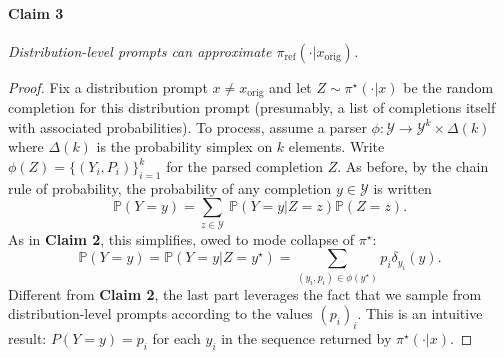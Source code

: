 \paragraph{Claim 3} \textit{Distribution-level prompts can approximate $\pi_\text{ref}(\cdot | x_\text{orig})$.}
\begin{proof}
Fix a distribution prompt $x \neq x_\text{orig}$ and let $Z \sim \pi^\star(\cdot | x)$ be the random completion for this distribution prompt (presumably, a list of completions itself with associated probabilities). To process, assume a parser $\phi : \mathcal{Y} \to \mathcal{Y}^k \times \Delta(k)$ where $\Delta(k)$ is the probability simplex on $k$ elements. Write $\phi(Z) = \{(Y_i, P_i)\}_{i=1}^k$ for the parsed completion $Z$. As before, by the chain rule of probability, the probability of any completion $y \in \mathcal{Y}$ is written
\begin{equation}
    \mathbb{P}(Y = y) = \sum_{z \in \mathcal{Y}} \ \mathbb{P}(Y = y | Z = z)\mathbb{P}(Z = z).
\end{equation}
As in \textbf{Claim 2}, this simplifies, owed to mode collapse of $\pi^\star$:
\begin{equation}
    \mathbb{P}(Y = y) = \mathbb{P}(Y = y | Z = y^\star) = \sum_{(y_i,p_i) \in \phi(y^\star)}  p_i\delta_{y_i}(y).
\end{equation}
Different from \textbf{Claim 2}, the last part leverages the fact that we sample from distribution-level prompts according to the values $(p_i)_i$. This is an intuitive result: $P(Y = y) = p_i$ for each $y_i$ in the sequence returned by $\pi^\star(\cdot | x)$.


\end{proof}
